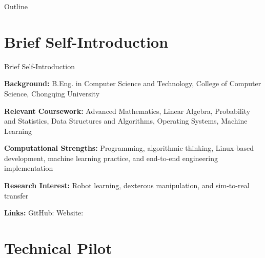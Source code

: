 \documentclass{beamer}
\title[Robot Learning and Control]{\PresentationTopic}
\subtitle{\PresentationSubtitle}
\author{\PresenterName \quad \PresenterSchool}
\date{July 11, 2026}
\begin{document}
\maketitle

\begin{frame}{Outline}
    \tableofcontents
\end{frame}

\section{Brief Self-Introduction}

\begin{frame}{Brief Self-Introduction}
    \small
    \setlength{\parskip}{0.55em}

    \textbf{\textcolor{maincolor}{Background:}} B.Eng. in Computer Science and Technology, College of Computer Science, Chongqing University

    \textbf{\textcolor{maincolor}{Relevant Coursework:}} Advanced Mathematics, Linear Algebra, Probability and Statistics, Data Structures and Algorithms, Operating Systems, Machine Learning

    \textbf{\textcolor{maincolor}{Computational Strengths:}} Programming, algorithmic thinking, Linux-based development, machine learning practice, and end-to-end engineering implementation

    \textbf{\textcolor{maincolor}{Research Interest:}} Robot learning, dexterous manipulation, and sim-to-real transfer

    \textbf{\textcolor{maincolor}{Links:}} GitHub:  \quad Website: 
\end{frame}

\section{Technical Pilot}
\end{document}
